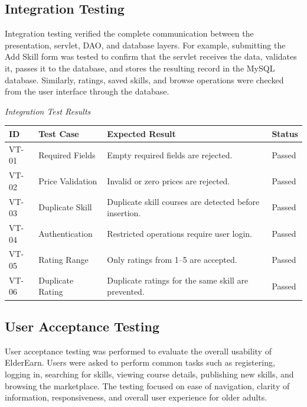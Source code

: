 \documentclass[12pt,a4paper]{report}
\begin{document}
\subsection{Integration Testing}
Integration testing verified the complete communication between the presentation, servlet, DAO, and database layers. For example, submitting the Add Skill form was tested to confirm that the servlet receives the data, validates it, passes it to the database, and stores the resulting record in the MySQL database. Similarly, ratings, saved skills, and browse operations were checked from the user interface through the database.

\vspace{0.3cm}
\noindent\textit{Integration Test Results}
\vspace{0.2cm}

\begin{table}[H]
\centering
\small
\begin{tabularx}{\textwidth}{|L{1.8cm}|L{3.8cm}|L{5.0cm}|L{2.0cm}|}
\hline
\textbf{ID} & \textbf{Test Case} & \textbf{Expected Result} & \textbf{Status} \\ \hline
VT-01 & Required Fields & Empty required fields are rejected. & Passed \\ \hline
VT-02 & Price Validation & Invalid or zero prices are rejected. & Passed \\ \hline
VT-03 & Duplicate Skill & Duplicate skill courses are detected before insertion. & Passed \\ \hline
VT-04 & Authentication & Restricted operations require user login. & Passed \\ \hline
VT-05 & Rating Range & Only ratings from 1--5 are accepted. & Passed \\ \hline
VT-06 & Duplicate Rating & Duplicate ratings for the same skill are prevented. & Passed \\ \hline
\end{tabularx}
\end{table}

\subsection{User Acceptance Testing}
User acceptance testing was performed to evaluate the overall usability of ElderEarn. Users were asked to perform common tasks such as registering, logging in, searching for skills, viewing course details, publishing new skills, and browsing the marketplace. The testing focused on ease of navigation, clarity of information, responsiveness, and overall user experience for older adults.
\end{document}
